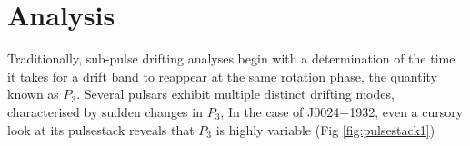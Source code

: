 \documentclass[linenumbers]{aastex631}
\newcommand{\psr}{J0024$-$1932}
\begin{document}
\section{Analysis} \label{sec:analysis}

Traditionally, sub-pulse drifting analyses begin with a determination of the time it takes for a drift band to reappear at the same rotation phase, the quantity known as $P_3$.
Several pulsars exhibit multiple distinct drifting modes, characterised by sudden changes in $P_3$, 
In the case of \psr{}, even a cursory look at its pulsestack reveals that $P_3$ is highly variable (Fig \ref{fig:pulsestack1})
\begin{figure*}[!t]
\caption{Pulse stack of observation on MJD 58434 with and without modelling\dots}
\label{fig:pulsestack1}
\end{figure*}

{}



\end{document}
